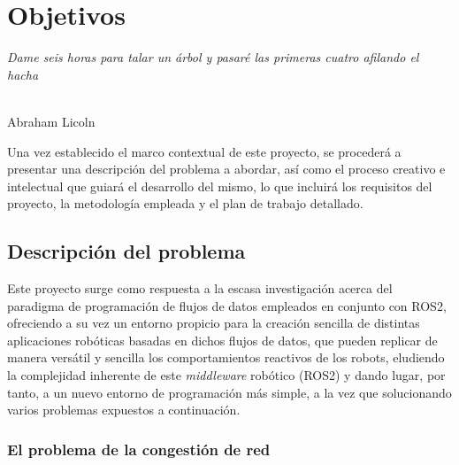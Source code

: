 \chapter{Objetivos}
\label{cap:capitulo2}

\begin{flushright}
\begin{minipage}[]{10cm}
\emph{Dame seis horas para talar un árbol y pasaré las primeras cuatro afilando el hacha}\\
\end{minipage}\\

Abraham Licoln\\
\end{flushright}

\vspace{1cm}

Una vez establecido el marco contextual de este proyecto, se procederá a
presentar una descripción del problema a abordar, así como el proceso creativo e
intelectual que guiará el desarrollo del mismo, lo que incluirá los requisitos
del proyecto, la metodología empleada y el plan de trabajo detallado.


\section{Descripción del problema}
\label{sec:descripcion}

Este proyecto surge como respuesta a la escasa investigación acerca del
paradigma de programación de flujos de datos empleados en conjunto con ROS2,
ofreciendo a su vez un entorno propicio para la creación sencilla de distintas
aplicaciones robóticas basadas en dichos flujos de datos, que pueden replicar de
manera versátil y sencilla los comportamientos reactivos de los robots,
eludiendo la complejidad inherente de este \textit{middleware} robótico (ROS2) y
dando lugar, por tanto, a un nuevo entorno de programación más simple, a la vez
que solucionando varios problemas expuestos a continuación.


\subsection{El problema de la congestión de red}
\label{sec:problema_congestion}

